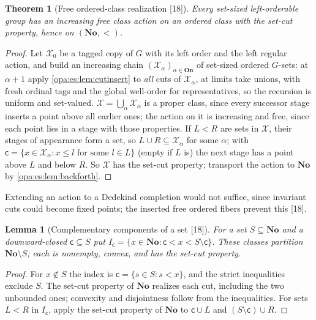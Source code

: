 \documentclass[11pt,oneside]{article}
\numberwithin{equation}{section}
\newtheorem{theorem}{Theorem}[section]
\newtheorem{lemma}[lemma]{Lemma}
\theoremstyle{definition}
\theoremstyle{remark}
\newcommand{\No}{\mathbf{No}}
\newcommand{\src}[1]{\textup{\textsf{\small[#1]}}}
\newcommand{\On}{\mathbf{On}}
\begin{document}
\begin{theorem}[Free ordered-class realization \src{18}]\label{opa:es:thm:freeorder}
Every set-sized left-orderable group has an increasing free class action on an ordered class with the set-cut property, hence on
$(\No,<)$.
\end{theorem}
\begin{proof}
Let $\mathcal X_0$ be a tagged copy of $G$ with its left order and the left regular action, and build an increasing chain
$(\mathcal X_\alpha)_{\alpha\in\On}$ of set-sized ordered $G$-sets: at $\alpha+1$ apply \cref{opa:es:lem:cutinsert} to \emph{all} cuts of
$\mathcal X_\alpha$, at limits take unions, with fresh ordinal tags and the global well-order for representatives, so the recursion is
uniform and set-valued. $\mathcal X=\bigcup_\alpha\mathcal X_\alpha$ is a proper class, since every successor stage inserts a point above
all earlier ones; the action on it is increasing and free, since each point lies in a stage with those properties. If $L<R$ are sets in
$\mathcal X$, their stages of appearance form a set, so $L\cup R\subseteq\mathcal X_\alpha$ for some $\alpha$; with
$\mathsf c=\{x\in\mathcal X_\alpha:x\le l\text{ for some }l\in L\}$ (empty if $L$ is) the next stage has a point above $L$ and below $R$.
So $\mathcal X$ has the set-cut property; transport the action to $\No$ by \cref{opa:es:lem:backforth}.
\end{proof}

Extending an action to a Dedekind completion would not suffice, since invariant cuts could become fixed points; the inserted free
ordered fibers prevent this \src{18}.

\begin{lemma}[Complementary components of a set \src{18}]\label{opa:es:lem:components}
For a set $S\subseteq\No$ and a downward-closed $\mathsf c\subseteq S$ put $I_{\mathsf c}=\{x\in\No:\mathsf c<x<S\setminus\mathsf c\}$. These
classes partition $\No\setminus S$; each is nonempty, convex, and has the set-cut property.
\end{lemma}
\begin{proof}
For $x\notin S$ the index is $\mathsf c=\{s\in S:s<x\}$, and the strict inequalities exclude $S$. The set-cut property of $\No$ realizes
each cut, including the two unbounded ones; convexity and disjointness follow from the inequalities. For sets $L<R$ in $I_{\mathsf c}$,
apply the set-cut property of $\No$ to $\mathsf c\cup L$ and $(S\setminus\mathsf c)\cup R$.
\end{proof}
\end{document}
